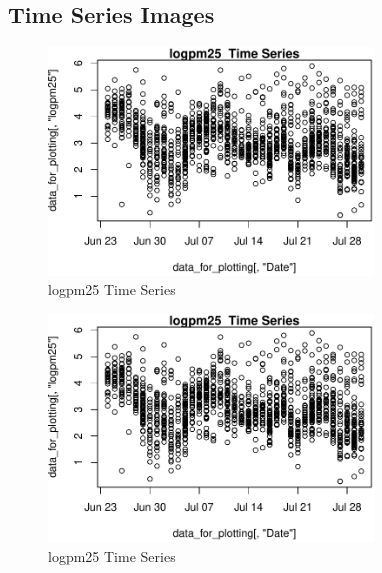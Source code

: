 
\subsection{ Time Series Images} 
 

\begin{figure} 
\centering  
\includegraphics[width=0.77\textwidth]{Code_Outputs/ML_input_report_AllforCaret_cleaned_StepPractice_part_practice_logpm25TS.pdf} 
\caption{\label{fig:ML_input_report_AllforCaret_cleaned_StepPractice_part_practicelogpm25TS}logpm25  Time Series} 
\end{figure} 
 

\begin{figure} 
\centering  
\includegraphics[width=0.77\textwidth]{Code_Outputs/ML_input_report_AllforCaret_cleaned_StepPractice_part_practice_logpm25TS.pdf} 
\caption{\label{fig:ML_input_report_AllforCaret_cleaned_StepPractice_part_practicelogpm25TS}logpm25  Time Series} 
\end{figure} 
 

